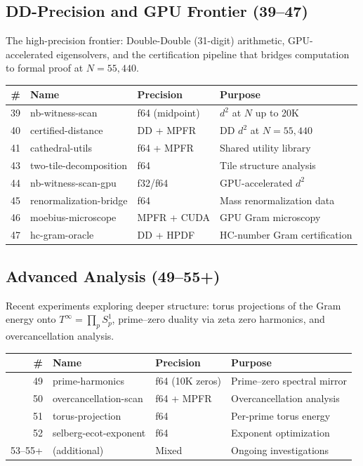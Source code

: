 \documentclass[11pt,a4paper]{article}
\begin{document}
\subsection{DD-Precision and GPU Frontier (39--47)}

The high-precision frontier: Double-Double (31-digit) arithmetic,
GPU-accelerated eigensolvers, and the certification pipeline that
bridges computation to formal proof at $N = 55{,}440$.

\begin{center}\small
\begin{tabular}{@{}rllp{5cm}@{}}
\toprule
\textbf{\#} & \textbf{Name} & \textbf{Precision} & \textbf{Purpose} \\
\midrule
39 & nb-witness-scan & f64 (midpoint) & $d^2$ at $N$ up to 20K \\
40 & certified-distance & DD + MPFR & DD $d^2$ at $N = 55{,}440$ \\
41 & cathedral-utils & f64 + MPFR & Shared utility library \\
43 & two-tile-decomposition & f64 & Tile structure analysis \\
44 & nb-witness-scan-gpu & f32/f64 & GPU-accelerated $d^2$ \\
45 & renormalization-bridge & f64 & Mass renormalization data \\
46 & moebius-microscope & MPFR + CUDA & GPU Gram microscopy \\
47 & hc-gram-oracle & DD + HPDF & HC-number Gram certification \\
\bottomrule
\end{tabular}
\end{center}

\subsection{Advanced Analysis (49--55+)}

Recent experiments exploring deeper structure: torus projections
of the Gram energy onto $T^\infty = \prod_p S^1_p$, prime--zero
duality via zeta zero harmonics, and overcancellation analysis.

\begin{center}\small
\begin{tabular}{@{}rllp{5cm}@{}}
\toprule
\textbf{\#} & \textbf{Name} & \textbf{Precision} & \textbf{Purpose} \\
\midrule
49 & prime-harmonics & f64 (10K zeros) & Prime--zero spectral mirror \\
50 & overcancellation-scan & f64 + MPFR & Overcancellation analysis \\
51 & torus-projection & f64 & Per-prime torus energy \\
52 & selberg-ecot-exponent & f64 & Exponent optimization \\
53--55+ & (additional) & Mixed & Ongoing investigations \\
\bottomrule
\end{tabular}
\end{center}
\end{document}
